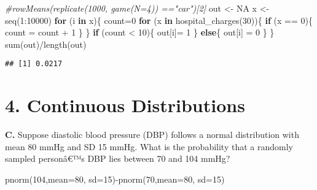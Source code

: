 \documentclass[
]{article}
\newenvironment{Shaded}{\begin{snugshade}}{\end{snugshade}}
\newcommand{\AttributeTok}[1]{\textcolor[rgb]{0.77,0.63,0.00}{#1}}
\newcommand{\CommentTok}[1]{\textcolor[rgb]{0.56,0.35,0.01}{\textit{#1}}}
\newcommand{\ConstantTok}[1]{\textcolor[rgb]{0.00,0.00,0.00}{#1}}
\newcommand{\ControlFlowTok}[1]{\textcolor[rgb]{0.13,0.29,0.53}{\textbf{#1}}}
\newcommand{\DecValTok}[1]{\textcolor[rgb]{0.00,0.00,0.81}{#1}}
\newcommand{\FunctionTok}[1]{\textcolor[rgb]{0.00,0.00,0.00}{#1}}
\newcommand{\NormalTok}[1]{#1}
\newcommand{\OtherTok}[1]{\textcolor[rgb]{0.56,0.35,0.01}{#1}}
\newcommand{\SpecialCharTok}[1]{\textcolor[rgb]{0.00,0.00,0.00}{#1}}
\begin{document}
\begin{Shaded}
\begin{Highlighting}[]
\CommentTok{\#rowMeans(replicate(1000, game(N=4)) =="car")[2]}
\NormalTok{out }\OtherTok{\textless{}{-}} \ConstantTok{NA}
\NormalTok{x }\OtherTok{\textless{}{-}} \FunctionTok{seq}\NormalTok{(}\DecValTok{1}\SpecialCharTok{:}\DecValTok{10000}\NormalTok{)}
\ControlFlowTok{for}\NormalTok{ (i }\ControlFlowTok{in}\NormalTok{ x)\{}
\NormalTok{  count}\OtherTok{=}\DecValTok{0}
  \ControlFlowTok{for}\NormalTok{ (x }\ControlFlowTok{in} \FunctionTok{hospital\_charges}\NormalTok{(}\DecValTok{30}\NormalTok{))\{}
    \ControlFlowTok{if}\NormalTok{ (x }\SpecialCharTok{==} \DecValTok{0}\NormalTok{)\{}
\NormalTok{      count }\OtherTok{=}\NormalTok{ count }\SpecialCharTok{+} \DecValTok{1}
\NormalTok{    \}}
\NormalTok{  \}}
  \ControlFlowTok{if}\NormalTok{ (count }\SpecialCharTok{\textless{}} \DecValTok{10}\NormalTok{)\{}
\NormalTok{    out[i]}\OtherTok{=} \DecValTok{1}
\NormalTok{  \}}
  \ControlFlowTok{else}\NormalTok{\{}
\NormalTok{    out[i] }\OtherTok{=} \DecValTok{0}
\NormalTok{  \}}
\NormalTok{\}}
\FunctionTok{sum}\NormalTok{(out)}\SpecialCharTok{/}\FunctionTok{length}\NormalTok{(out)}
\end{Highlighting}
\end{Shaded}

\begin{verbatim}
## [1] 0.0217
\end{verbatim}

\hypertarget{continuous-distributions}{%
\section{4. Continuous Distributions}\label{continuous-distributions}}

\textbf{C.} Suppose diastolic blood pressure (DBP) follows a normal
distribution with mean 80 mmHg and SD 15 mmHg. What is the probability
that a randomly sampled personâ€™s DBP lies between 70 and 104 mmHg?

\begin{Shaded}
\begin{Highlighting}[]
\FunctionTok{pnorm}\NormalTok{(}\DecValTok{104}\NormalTok{,}\AttributeTok{mean=}\DecValTok{80}\NormalTok{, }\AttributeTok{sd=}\DecValTok{15}\NormalTok{)}\SpecialCharTok{{-}}\FunctionTok{pnorm}\NormalTok{(}\DecValTok{70}\NormalTok{,}\AttributeTok{mean=}\DecValTok{80}\NormalTok{, }\AttributeTok{sd=}\DecValTok{15}\NormalTok{)}
\end{Highlighting}
\end{Shaded}
\end{document}

